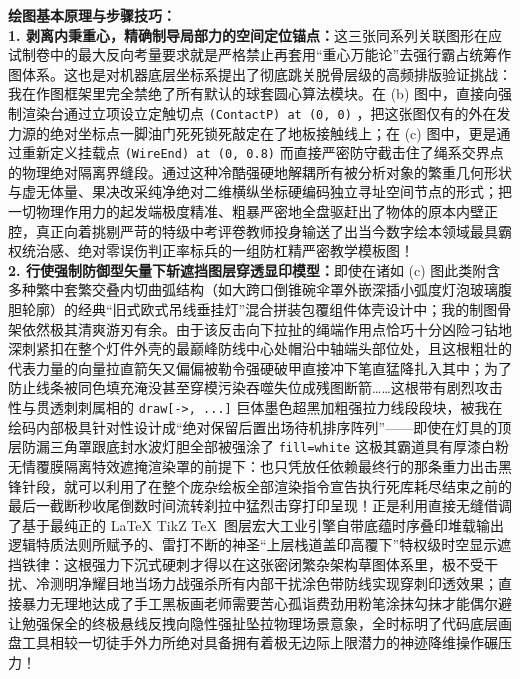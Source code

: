 \documentclass[12pt, a4paper]{ctexrep}
\begin{document}
\vspace{0.6cm}

{\small\color{blue!70!black}
\textbf{绘图基本原理与步骤技巧：}\\
\textbf{1. 剥离内秉重心，精确制导局部力的空间定位锚点：}这三张同系列关联图形在应试制卷中的最大反向考量要求就是严格禁止再套用“重心万能论”去强行霸占统筹作图体系。这也是对机器底层坐标系提出了彻底跳关脱骨层级的高频排版验证挑战：我在作图框架里完全禁绝了所有默认的球套圆心算法模块。在 (b) 图中，直接向强制渲染台通过立项设立定触切点 \texttt{(ContactP) at (0, 0)} ，把这张图仅有的外在发力源的绝对坐标点一脚油门死死锁死敲定在了地板接触线上；在 (c) 图中，更是通过重新定义挂载点 \texttt{(WireEnd) at (0, 0.8)} 而直接严密防守截击住了绳系交界点的物理绝对隔离界缝段。通过这种冷酷强硬地解耦所有被分析对象的繁重几何形状与虚无体量、果决改采纯净绝对二维横纵坐标硬编码独立寻址空间节点的形式；把一切物理作用力的起发端极度精准、粗暴严密地全盘驱赶出了物体的原本内壁正腔，真正向着挑剔严苛的特级中考评卷教师投身输送了出当今数字绘本领域最具霸权统治感、绝对零误伤判正率标兵的一组防杠精严密教学模板图！\\
\textbf{2. 行使强制防御型矢量下斩遮挡图层穿透显印模型：}即使在诸如 (c) 图此类附含多种繁中套繁交叠内切曲弧结构（如大跨口倒锥碗伞罩外嵌深插小弧度灯泡玻璃腹胆轮廓）的经典“旧式欧式吊线垂挂灯”混合拼装包覆组件体壳设计中；我的制图骨架依然极其清爽游刃有余。由于该反击向下拉扯的绳端作用点恰巧十分凶险刁钻地深刺紧扣在整个灯件外壳的最巅峰防线中心处帽沿中轴端头部位处，且这根粗壮的代表力量的向量拉直箭矢又偏偏被勒令强硬破甲直接冲下笔直猛降扎入其中；为了防止线条被同色填充淹没甚至穿模污染吞噬失位成残图断箭……这根带有剧烈攻击性与贯透刺刺属相的 \texttt{draw[->, ...]} 巨体墨色超黑加粗强拉力线段段块，被我在绘码内部极具针对性设计成“绝对保留后置出场待机排序阵列”——即使在灯具的顶层防漏三角罩跟底封水波灯胆全部被强涂了 \texttt{fill=white} 这极其霸道具有厚漆白粉无情覆膜隔离特效遮掩渲染罩的前提下：也只凭放任依赖最终行的那条重力出击黑锋针段，就可以利用了在整个庞杂绘板全部渲染指令宣告执行死库耗尽结束之前的最后一截断秒收尾倒数时间流转刹拉中猛烈击穿打印呈现！正是利用直接无缝借调了基于最纯正的 LaTeX TikZ \TeX\ 图层宏大工业引擎自带底蕴时序叠印堆载输出逻辑特质法则所赋予的、雷打不断的神圣“上层栈道盖印高覆下”特权级时空显示遮挡铁律：这根强力下沉式硬刺才得以在这张密闭繁杂架构草图体系里，极不受干扰、冷测明净耀目地当场力战强杀所有内部干扰涂色带防线实现穿刺印透效果；直接暴力无理地达成了手工黑板画老师需要苦心孤诣费劲用粉笔涂抹勾抹才能偶尔避让勉强保全的终极悬线反拽向隐性强扯坠拉物理场景意象，全时标明了代码底层画盘工具相较一切徒手外力所绝对具备拥有着极无边际上限潜力的神迹降维操作碾压力！
}
\end{document}
